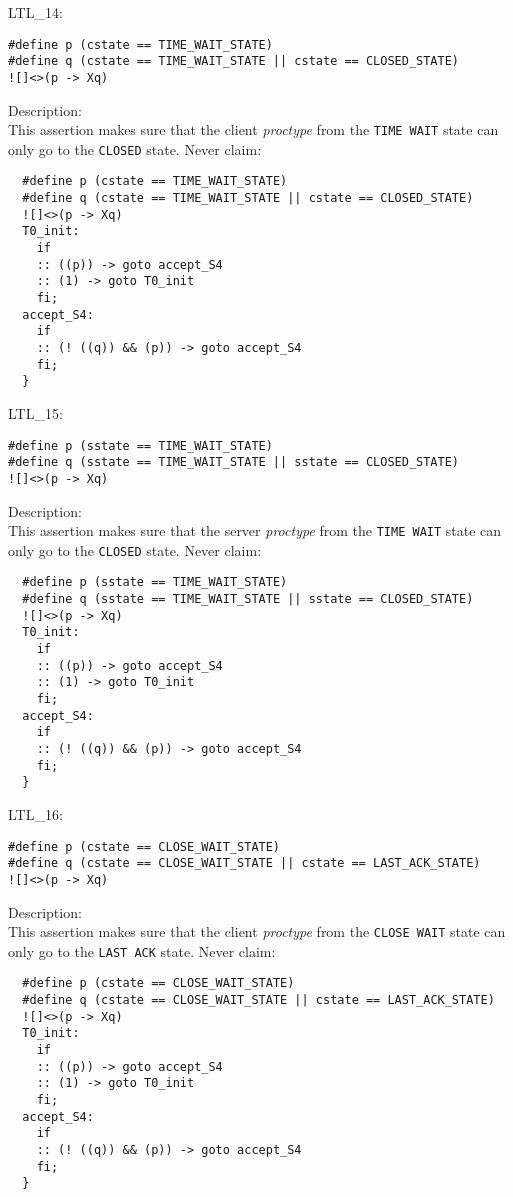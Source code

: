 \documentclass{WigReport}
\begin{document}
LTL\_14:\\
\begin{lstlisting}
#define p (cstate == TIME_WAIT_STATE)
#define q (cstate == TIME_WAIT_STATE || cstate == CLOSED_STATE)
![]<>(p -> Xq)
\end{lstlisting}
Description:\\
This assertion makes sure that the client \textit{proctype} from the \verb|TIME WAIT| state can only go to the \verb|CLOSED| state.
Never claim:\\
\begin{lstlisting}
  #define p (cstate == TIME_WAIT_STATE)
  #define q (cstate == TIME_WAIT_STATE || cstate == CLOSED_STATE)
  ![]<>(p -> Xq)
  T0_init:
    if
    :: ((p)) -> goto accept_S4
    :: (1) -> goto T0_init
    fi;
  accept_S4:
    if
    :: (! ((q)) && (p)) -> goto accept_S4
    fi;
  }
\end{lstlisting}


LTL\_15:\\
\begin{lstlisting}
#define p (sstate == TIME_WAIT_STATE)
#define q (sstate == TIME_WAIT_STATE || sstate == CLOSED_STATE)
![]<>(p -> Xq)
\end{lstlisting}
Description:\\
This assertion makes sure that the server \textit{proctype} from the \verb|TIME WAIT| state can only go to the \verb|CLOSED| state.
Never claim:\\
\begin{lstlisting}
  #define p (sstate == TIME_WAIT_STATE)
  #define q (sstate == TIME_WAIT_STATE || sstate == CLOSED_STATE)
  ![]<>(p -> Xq)
  T0_init:
    if
    :: ((p)) -> goto accept_S4
    :: (1) -> goto T0_init
    fi;
  accept_S4:
    if
    :: (! ((q)) && (p)) -> goto accept_S4
    fi;
  }
\end{lstlisting}


LTL\_16:\\
\begin{lstlisting}
#define p (cstate == CLOSE_WAIT_STATE)
#define q (cstate == CLOSE_WAIT_STATE || cstate == LAST_ACK_STATE)
![]<>(p -> Xq)
\end{lstlisting}
Description:\\
This assertion makes sure that the client \textit{proctype} from the \verb|CLOSE WAIT| state can only go to the \verb|LAST ACK| state.
Never claim:\\
\begin{lstlisting}
  #define p (cstate == CLOSE_WAIT_STATE)
  #define q (cstate == CLOSE_WAIT_STATE || cstate == LAST_ACK_STATE)
  ![]<>(p -> Xq)
  T0_init:
    if
    :: ((p)) -> goto accept_S4
    :: (1) -> goto T0_init
    fi;
  accept_S4:
    if
    :: (! ((q)) && (p)) -> goto accept_S4
    fi;
  }
\end{lstlisting}
\end{document}
